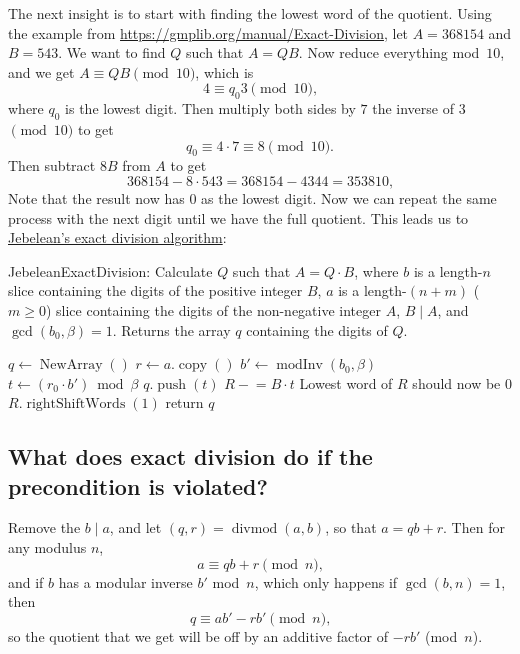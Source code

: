 \documentclass{computer-arithmetic}
\begin{document}
The next insight is to start with finding the lowest word of the
quotient. Using the example from
\url{https://gmplib.org/manual/Exact-Division}, let \(A = 368154\) and
\(B = 543\). We want to find \(Q\) such that \(A = QB\). Now reduce
everything mod~\(10\), and we get \(A ≡ QB \pmod{10}\), which is
\[
  4 ≡ q_0 3 \pmod{10}\text{,}
\]
where \(q_0\) is the lowest digit. Then multiply both sides by \(7\) the
inverse of \(3\) \(\pmod{10}\) to get
\[
  q_0 ≡ 4 ⋅ 7 ≡ 8 \pmod{10}\text{.}
\]
Then subtract \(8B\) from \(A\) to get
\[
  368154 - 8 ⋅ 543 = 368154 - 4344 = 353810\text{,}
\]
Note that the result now has \(0\) as the lowest digit. Now we can
repeat the same process with the next digit until we have the full
quotient. This leads us to
\href{https://www.sciencedirect.com/science/article/pii/S0747717183710126}{Jebelean's
  exact division algorithm}:

\begin{algorithm}
  \caption{JebeleanExactDivision: Calculate \(Q\) such that
    \(A = Q ⋅ B\), where \(b\) is a length-\(n\) slice containing the
    digits of the positive integer \(B\), \(a\) is a
    length-\((n + m)\) (\(m ≥ 0\)) slice containing the digits of the
    non-negative integer \(A\), \(B \mid A\), and
    \(\gcd(b_0, β) = 1\). Returns the array \(q\) containing the
    digits of \(Q\).}
  \begin{algorithmic}[1]
    \State \(q ← \operatorname{NewArray}()\)
    \State \(r ← a.\operatorname{copy}()\)
    \State \(b' ← \operatorname{modInv}(b_0, β)\)
    \State \(t ← (r_0 ⋅ b') \bmod β\)
    \State \(q.\operatorname{push}(t)\)
    \State \(R \mathrel{-}= B ⋅ t\)
    \Comment Lowest word of \(R\) should now be \(0\)
    \State \(R.\operatorname{rightShiftWords}(1)\)
    \EndWhile
    \State return \(q\)
\end{algorithmic}
\end{algorithm}

\subsection{What does exact division do if the precondition is violated?}

Remove the \(b \mid a\), and let
\((q, r) = \operatorname{divmod}(a, b)\), so that \(a = qb + r\). Then
for any modulus \(n\),
\[
  a ≡ qb + r \pmod n\text{,}
\]
and if \(b\) has a modular inverse \(b'\) mod~\(n\), which only
happens if \(\gcd(b, n) = 1\), then
\[
  q ≡ ab' - rb' \pmod n\text{,}
\]
so the quotient that we get will be off by an additive factor of
\(-rb'\) (mod~\(n\)).
\end{document}
